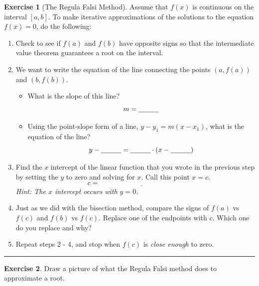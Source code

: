 \documentclass[
]{book}
\theoremstyle{definition}
\theoremstyle{definition}
\theoremstyle{definition}
\newtheorem{exercise}{Exercise}[chapter]
\theoremstyle{remark}
\begin{document}
\begin{exercise}[The Regula Falsi Method]
\protect\hypertarget{exr:regula-falsi}{}{\label{exr:regula-falsi} {} }Assume that \(f(x)\) is continuous on the interval \([a,b]\). To make iterative
approximations of the solutions to the equation \(f(x) = 0\), do the
following:

\begin{enumerate}
\def\labelenumi{\arabic{enumi}.}
\item
  Check to see if \(f(a)\) and \(f(b)\) have opposite signs so that the
  intermediate value theorem guarantees a root on the interval.
\item
  We want to write the equation of the line connecting the points
  \((a,f(a))\) and \((b,f(b))\).

  \begin{itemize}
  \item
    What is the slope of this line? \[m = \underline{\hspace{0.4in}}\]
  \item
    Using the point-slope form of a line, \(y-y_1 = m(x-x_1)\), what
    is the equation of the line?
    \[y - \underline{\hspace{0.4in}} = \underline{\hspace{0.4in}} \cdot
                        \left( x - \underline{\hspace{0.4in}} \right)\]
  \end{itemize}
\item
  Find the \(x\) intercept of the linear function that you wrote in the
  previous step by setting the \(y\) to zero and solving for \(x\). Call
  this point \(x=c\). \[c = \underline{\hspace{2in}}\]
  \emph{Hint: The \(x\) intercept occurs with \(y=0\).}
\item
  Just as we did with the bisection method, compare the signs of
  \(f(a)\) vs \(f(c)\) and \(f(b)\) vs \(f(c)\). Replace one of the endpoints
  with \(c\). Which one do you replace and why?
\item
  Repeat steps 2 - 4, and stop when \(f(c)\) is \emph{close enough} to zero.
\end{enumerate}
\end{exercise}

\begin{center}\rule{0.5\linewidth}{0.5pt}\end{center}

\begin{exercise}
\protect\hypertarget{exr:unnamed-chunk-92}{}{\label{exr:unnamed-chunk-92} }Draw a picture of what the Regula Falsi method does to approximate a
root.
\end{exercise}
\end{document}
